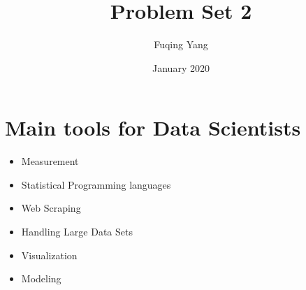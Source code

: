\documentclass{article}
\title{Problem Set 2}
\author{Fuqing Yang}
\date{January 2020}
\begin{document}
\maketitle

\section{Main tools for Data Scientists}
\begin{itemize}
    \item Measurement
    \item Statistical Programming languages
    \item Web Scraping
    \item Handling Large Data Sets
    \item Visualization
    \item Modeling
\end{itemize}
\end{document}
